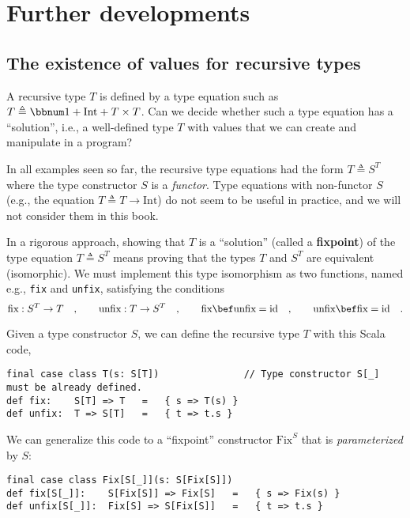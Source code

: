 \section{Further developments}

\subsection{The existence of values for recursive types\label{subsec:Recursive-types-and-the-existence-of-their-values}}

A recursive type $T$ is defined by a type equation such as $T\triangleq\bbnum 1+\text{Int}+T\times T$.
Can we decide whether such a type equation has a \textsf{``}solution\textsf{''}, i.e.,
a well-defined type $T$ with values that we can create and manipulate
in a program?

In all examples seen so far, the recursive type equations
had the form $T\triangleq S^{T}$ where the type constructor $S$
is a \emph{functor}. Type equations with non-functor $S$ (e.g., the
equation $T\triangleq T\rightarrow\text{Int}$) do not seem to be
useful in practice, and we will not consider them in this book.

In a rigorous approach, showing that $T$ is a \textsf{``}solution\textsf{''} (called
a \textbf{fixpoint}) of the type equation $T\triangleq S^{T}$
means proving that the types $T$ and $S^{T}$ are equivalent (isomorphic).
We must implement this type isomorphism as two functions, named e.g.,
\lstinline!fix! and \lstinline!unfix!, satisfying the conditions
\[
\text{fix}:S^{T}\rightarrow T\quad,\quad\quad\text{unfix}:T\rightarrow S^{T}\quad,\quad\quad\text{fix}\bef\text{unfix}=\text{id}\quad,\quad\quad\text{unfix}\bef\text{fix}=\text{id}\quad.
\]

Given a type constructor $S$, we can define the recursive type $T$
with this Scala code,
\begin{lstlisting}
final case class T(s: S[T])               // Type constructor S[_] must be already defined.
def fix:    S[T] => T   =   { s => T(s) }
def unfix:  T => S[T]   =   { t => t.s }
\end{lstlisting}
We can generalize this code to a \textsf{``}fixpoint\textsf{''} constructor $\text{Fix}^{S}$
that is \emph{parameterized} by $S$:
\begin{lstlisting}
final case class Fix[S[_]](s: S[Fix[S]])
def fix[S[_]]:    S[Fix[S]] => Fix[S]   =   { s => Fix(s) }
def unfix[S[_]]:  Fix[S] => S[Fix[S]]   =   { t => t.s }
\end{lstlisting}


